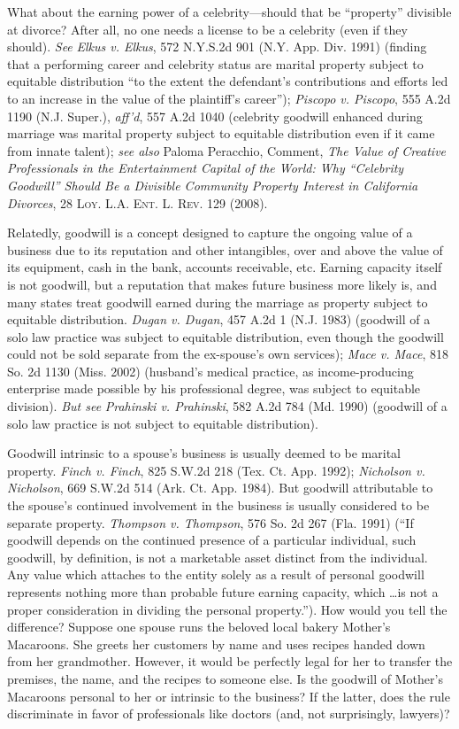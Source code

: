 What about the earning power of a celebrity---should that be ``property''
divisible at divorce? After all, no one needs a license to be a celebrity
(even if they should). \textit{See} \emph{Elkus v. Elkus}, 572 N.Y.S.2d 901
(N.Y. App. Div. 1991) (finding that a performing career and celebrity status are
marital property subject to equitable distribution ``to the extent the
defendant's contributions and efforts led to an increase in the value of the
plaintiff's career''); \emph{Piscopo v. Piscopo}, 555 A.2d 1190 (N.J. Super.),
\emph{aff'd},
557 A.2d 1040 (celebrity goodwill enhanced during marriage was marital property
subject to equitable distribution even if it came from innate talent);
\textit{see also} Paloma Peracchio, Comment, \emph{The Value of Creative
Professionals in the Entertainment Capital of the World: Why ``Celebrity
Goodwill'' Should Be a Divisible Community Property Interest in California
Divorces}, 28 \textsc{Loy. L.A. Ent. L. Rev.} 129 (2008).

\item
Relatedly, goodwill is a concept designed to capture the ongoing value of a
business due to its reputation and other intangibles, over and above the value
of its equipment, cash in the bank, accounts receivable, etc. Earning capacity
itself is not goodwill, but a reputation that makes future business more likely
is, and many states treat goodwill earned during the marriage as property
subject to equitable distribution. \emph{Dugan v. Dugan}, 457 A.2d 1 (N.J. 1983)
(goodwill of a solo law practice was subject to equitable distribution, even
though the goodwill could not be sold separate from the ex-spouse's own
services); \emph{Mace v. Mace}, 818 So. 2d 1130 (Miss. 2002) (husband's medical
practice, as income-producing enterprise made possible by his professional
degree, was subject to equitable division). \textit{But see} \emph{Prahinski v.
Prahinski}, 582 A.2d 784 (Md. 1990) (goodwill of a solo law practice is not
subject to equitable distribution).

Goodwill intrinsic to a spouse's business is usually deemed to be marital
property. \emph{Finch v. Finch}, 825 S.W.2d 218 (Tex. Ct. App. 1992);
\emph{Nicholson v. Nicholson}, 669 S.W.2d 514 (Ark. Ct. App. 1984). But goodwill
attributable to the spouse's continued involvement in the business is usually
considered to be separate property. \emph{Thompson v. Thompson}, 576 So. 2d 267
(Fla. 1991) (``If goodwill depends on the continued presence of a particular
individual, such goodwill, by definition, is not a marketable asset distinct
from the individual. Any value which attaches to the entity solely as a result
of personal goodwill represents nothing more than probable future earning
capacity, which \dots is not a proper consideration in dividing the personal
property.''). How would you tell the difference? Suppose one spouse runs the
beloved local bakery Mother's Macaroons. She greets her customers by name and
uses recipes handed down from her grandmother. However, it would be perfectly
legal for her to transfer the premises, the name, and the recipes to someone
else. Is the goodwill of Mother's Macaroons personal to her or intrinsic to the
business? If the latter, does the rule discriminate in favor of professionals
like doctors (and, not surprisingly, lawyers)?

